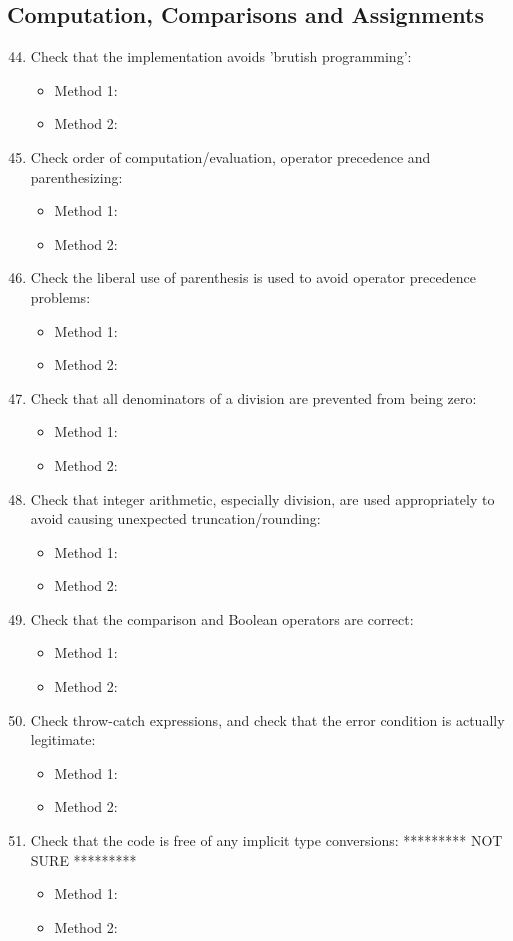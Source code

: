 \subsection{Computation, Comparisons and Assignments}
\begin{enumerate}
	\setcounter{enumi}{43}
	\item Check that the implementation avoids 'brutish programming':
	\begin{itemize}
		\item Method 1: \cmark
		\item Method 2:
	\end{itemize}
	\item Check order of computation/evaluation, operator precedence and parenthesizing:
	\begin{itemize}
		\item Method 1: \cmark
		\item Method 2:
	\end{itemize}
	\item Check the liberal use of parenthesis is used to avoid operator precedence problems:
	\begin{itemize}
		\item Method 1: \cmark
		\item Method 2: 
	\end{itemize}
	\item Check that all denominators of a division are prevented from being zero:
	\begin{itemize}
		\item Method 1: \cmark
		\item Method 2:
	\end{itemize}
	\item Check that integer arithmetic, especially division, are used appropriately to avoid causing unexpected truncation/rounding:
	\begin{itemize}
		\item Method 1: \cmark
		\item Method 2:
	\end{itemize}
	\item Check that the comparison and Boolean operators are correct:
	\begin{itemize}
		\item Method 1: \cmark
		\item Method 2: 
	\end{itemize}
	\item Check throw-catch expressions, and check that the error condition is actually legitimate:
	\begin{itemize}
		\item Method 1: \cmark
		\item Method 2: \cmark
	\end{itemize}
	\item Check that the code is free of any implicit type conversions: ********* NOT SURE *********
	\begin{itemize}
		\item Method 1: 
		\item Method 2: \cmark
	\end{itemize}
\end{enumerate}